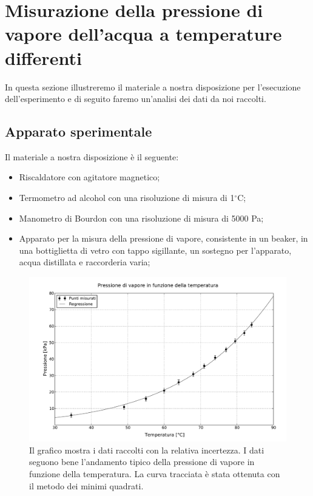 \section{Misurazione della pressione di vapore dell'acqua a temperature differenti}

In questa sezione illustreremo il materiale a nostra disposizione per l'esecuzione
dell'esperimento e di seguito faremo un'analisi dei dati da noi raccolti.

\subsection{Apparato sperimentale}

Il materiale a nostra disposizione è il seguente:
\begin{itemize}
	\item{Riscaldatore con agitatore magnetico;}
	\item{Termometro ad alcohol con una risoluzione di misura di 1$^\circ$C;}
	\item{Manometro di Bourdon con una risoluzione di misura di 5000 Pa;}
	\item{Apparato per la misura della pressione di vapore, consistente in un beaker,
    in una bottiglietta di vetro con tappo sigillante, un sostegno per l'apparato, acqua distillata e raccorderia varia;}
\end{itemize}

\begin{figure}[b!]
    \includegraphics[width=17cm]{graph.pdf}
    \caption{Il grafico mostra i dati raccolti con la relativa incertezza. I dati seguono bene
    l'andamento tipico della pressione di vapore in funzione della temperatura.
    La curva tracciata è stata ottenuta con il metodo dei minimi quadrati.}
    \label{fig:graph}
\end{figure}

